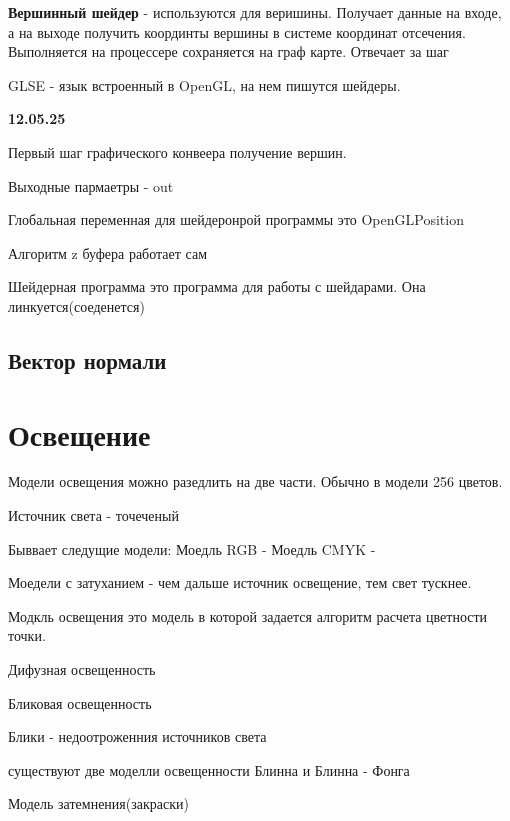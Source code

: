 \documentclass{article}
\begin{document}
\textbf{Вершинный шейдер} - используются для веришины. Получает данные на входе, 
а на выходе получить координты вершины в системе координат отсечения. 
Выполняется на процессере сохраняется на граф карте. Отвечает за шаг

GLSE - язык встроенный в OpenGL, на нем пишутся шейдеры.



\vspace{5mm}

\textbf{12.05.25}

Первый шаг графического конвеера получение вершин.

Выходные пармаетры - out

Глобальная переменная для шейдеронрой программы это OpenGLPosition


Алгоритм z буфера работает сам

Шейдерная программа это программа для работы с шейдарами. 
Она линкуется(соеденется)


\subsection{Вектор нормали}




\vspace{5mm}


\section{Освещение}

Модели освещения можно разедлить на две части.
Обычно в модели 256 цветов. 


Источник света - точеченый 


Быввает следущие модели:
Моедль RGB - 
Моедль CMYK - 



Моедели с затуханием - чем дальше источник освещение,
тем свет тускнее.


Модкль освещения это модель в которой задается алгоритм
 расчета цветности точки.

 Дифузная освещенность


 Бликовая освещенность

 Блики - недоотроженния источников света 

 существуют две моделли освещенности Блинна и Блинна - Фонга

 Модель затемнения(закраски)
\end{document}
